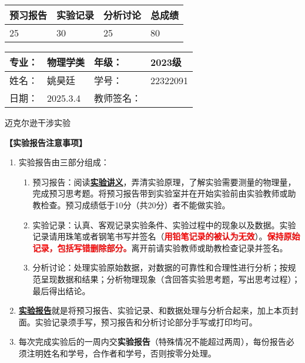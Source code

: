 \documentclass[dvipsnames, svgnames,a4paper,11pt]{article}
\newcommand{\exname}{迈克尔逊干涉实验}%
\begin{document}
\begin{table}
	\renewcommand\arraystretch{1.7}
	\begin{tabularx}{\textwidth}{
		|X|X|X|X
		|X|X|X|X|}
	\hline
	\multicolumn{2}{|c|}{预习报告}&\multicolumn{2}{|c|}{实验记录}&\multicolumn{2}{|c|}{分析讨论}&\multicolumn{2}{|c|}{总成绩}\\
	\hline
	 \hspace{0.625cm}25& & \hspace{0.625cm}30  & & \hspace{0.625cm}25  & &  \hspace{0.625cm}80 & \\
	\hline
	\end{tabularx}
\end{table}


\begin{table}
	\renewcommand\arraystretch{1.7}
	\begin{tabularx}{\textwidth}{|X|X|X|X|}
	\hline
	专业：& 物理学类 &年级：&2023级 \\
	\hline
	姓名：& 姚昊廷  & 学号：&22322091\\
	\hline
	日期：&2025.3.4 & 教师签名：& \\
	\hline
	\end{tabularx}
\end{table}

\begin{center}
	\LARGE \exname
\end{center}

\textbf{【实验报告注意事项】}
\begin{enumerate}
	\item 实验报告由三部分组成：
	\begin{enumerate}
		\item 预习报告：阅读\underline{\textbf{实验讲义}}，弄清实验原理，了解实验需要测量的物理量，完成预习思考题。将预习报告带到实验室并在开始实验前由实验教师或助教检查。预习成绩低于10分（共20分）者不能做实验。
	    \item 实验记录：认真、客观记录实验条件、实验过程中的现象以及数据。实验记录请用珠笔或者钢笔书写并签名（\textcolor{red}{\textbf{用铅笔记录的被认为无效}}）。\textcolor{red}{\textbf{保持原始记录，包括写错删除部分。}}离开前请实验教师或助教检查记录并签名。
	    \item 分析讨论：处理实验原始数据，对数据的可靠性和合理性进行分析；按规范呈现数据和结果；分析物理现象（含回答实验思考题，写出思考过程）；最后得出结论。
	\end{enumerate}
	\item \underline{\textbf{实验报告}}就是将预习报告、实验记录、和数据处理与分析合起来，加上本页封面。实验记录须手写，预习报告和分析讨论部分手写或打印均可。
	\item 每次完成实验后的一周内交\textbf{实验报告}（特殊情况不能超过两周），每份报告必须注明姓名和学号，合作者和学号，否则按零分处理。
\end{enumerate}
\end{document}
